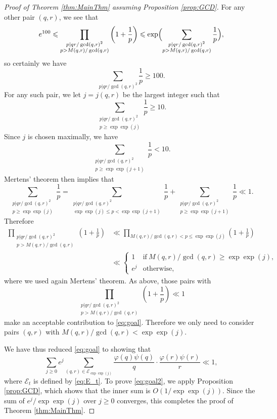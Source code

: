 \documentclass[12pt]{amsart}
\numberwithin{equation}{section}
\theoremstyle{definition}
\theoremstyle{remark}
\newcommand{\CE}{\mathcal{E}}
\newcommand{\als}[1]{\begin{align*} #1 \end{align*} }
\renewcommand{\phi}{\varphi}
\renewcommand{\le}{\leqslant}
\renewcommand{\ge}{\geqslant}
\begin{document}
\begin{proof}[Proof of Theorem \ref{thm:MainThm} assuming Proposition \ref{prop:GCD}]
For any other pair $(q,r)$, we see that 
\[
e^{100} \le 
	\prod_{\substack{p|qr/\gcd(q,r)^2 \\ p>M(q,r)/\gcd(q,r)}}\left(1+\frac{1}{p}\right)
	\le \exp\Bigl(\sum_{\substack{p|qr/\gcd(q,r)^2 \\ p>M(q,r)/\gcd(q,r)}}\frac{1}{p}\Bigr),
\]
so certainly we have
\[
\sum_{p|qr/\gcd(q,r)^2}\frac{1}{p} \ge 100.
\]
For any such pair, we let $j=j(q,r)$ be the largest integer such that
\[
\sum_{\substack{p| qr/\gcd(q,r)^2 \\ p\ge \exp\exp(j)}} \frac{1}{p}  \ge 10. 
\]
Since $j$ is chosen maximally, we have 
\[
\sum_{\substack{p| qr/\gcd(q,r)^2 \\ p\ge \exp\exp(j+1)}} \frac{1}{p}  <10 .
\]
Mertens' theorem then implies that 
\[
\sum_{\substack{p| qr/\gcd(q,r)^2 \\ p\ge \exp\exp(j)}} \frac{1}{p}=\sum_{\substack{p| qr/\gcd(q,r)^2 \\ \exp\exp(j)\le p <\exp\exp(j+1)}} \frac{1}{p}+\sum_{\substack{p| qr/\gcd(q,r)^2 \\ p\ge \exp\exp(j+1)}} \frac{1}{p}  \ll 1  .
\]
Therefore
\als{
	\prod_{\substack{p| qr/\gcd(q,r)^2 \\ p>M(q,r)/\gcd(q,r)}}\left(1+\frac{1}{p}\right)
	&\ll \prod_{M(q,r)/\gcd(q,r)<p\le \exp\exp(j)} \left(1+\frac{1}{p}\right)  \\
	&\ll\begin{cases}
		1&\text{if}\ M(q,r)/\gcd(q,r)\ge  \exp\exp(j),\\
		e^j &\text{otherwise},
	\end{cases}
}
where we used again Mertens' theorem. As above, those pairs with 
\[
\prod_{\substack{p| qr/\gcd(q,r)^2 \\ p>M(q,r)/\gcd(q,r)}}\left(1+\frac{1}{p}\right)\ll 1
\]
make an acceptable contribution to \eqref{eq:goal}. Therefore we only need to consider pairs $(q,r)$ with $M(q,r)/\gcd(q,r)<  \exp\exp(j)$.

We have thus reduced \eqref{eq:goal} to showing that
\begin{equation}\label{eq:goal2}
	\sum_{j\ge 0} e^j 
	\sum_{(q,r)\in \CE_{\exp\exp(j)}} \frac{\phi(q)\psi(q)}{q}\cdot \frac{\phi(r)\psi(r)}{r} \ll 1,
\end{equation}
where $\CE_t$ is defined by \eqref{eq:E_t}. To prove \eqref{eq:goal2}, we apply Proposition \ref{prop:GCD}, which shows that the inner sum is $O(1/\exp\exp(j))$. Since the sum of $e^j/\exp\exp(j)$ over $j\ge 0$ converges, this completes the proof of Theorem \ref{thm:MainThm}.
\end{proof}
\end{document}
